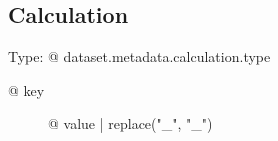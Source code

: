 \subsection{Calculation}

Type: {@ dataset.metadata.calculation.type }

\begin{description}
\item[{@ key }] {@ value | replace("_", "\_") }
\end{description}
